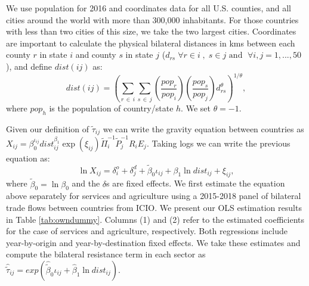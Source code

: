 \documentclass[12pt]{article}
\begin{document}
We use population for 2016 and coordinates data for all U.S. counties, and all cities around the world with more than 300,000 inhabitants. For those countries with less than two cities of this size, we take the two largest cities. Coordinates are important to calculate the physical bilateral distances in kms between each county $r$ in state $i$ and county $s$ in state $j$ ($d_{rs}\; \forall r\in i \; ,\; s\in j \text{ and }\;\forall i,j=1,...,50$), and define $dist\left(ij\right)$ as:
\begin{equation}
dist\left(ij\right) = \left(\sum_{r\, \in\, i} \sum_{s \, \in \, j} \left(\dfrac{pop_r}{pop_i}\right) \left(\dfrac{pop_s}{pop_j}\right) d_{rs}^\theta\right)^{1/ \theta},  \label{eq:distances}
\end{equation}
where $pop_h$ is the population of country/state $h$. We set $\theta=-1$.

Given our definition of $\tilde{\tau}_{ij}$ we can write the gravity equation between countries as $X_{ij}=\beta_{0}^{\iota_{ij}}dist_{ij}^{\beta_{1}}\exp\left(\xi_{ij}\right)\tilde{\Pi}_{i}^{-1}\tilde{P}_{j}^{-1}R_{i}E_{j}.$ Taking logs we can write the previous equation as: 
\begin{equation}
\ln X_{ij}=\delta_{i}^{o}+\delta_{j}^{d}+\tilde{\beta}_{0}\iota_{ij}+\beta_{1}\ln dist_{ij}+\xi_{ij}, \label{eq:gravity}
\end{equation}
where $\tilde{\beta}_{0}=\ln\beta_{0}$ and the $\delta$s are fixed effects. We first estimate the equation above separately for services and agriculture using a 2015-2018 panel of bilateral trade flows between countries from ICIO. We present our OLS estimation results in Table \ref{tab:owndummy}. Columns (1) and (2) refer to the estimated coefficients for the case of services and agriculture, respectively. Both regressions include year-by-origin and year-by-destination fixed effects. We take these estimates and compute the bilateral resistance term in each sector as $\hat{\tilde{\tau}}_{ij}=exp(\hat{\tilde{\beta}}_{0}\iota_{ij}+\hat{\beta}_{1}\ln dist_{ij})$. 
\end{document}
